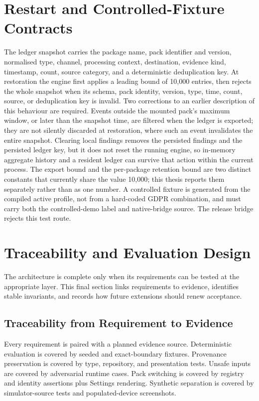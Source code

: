 \section{Restart and Controlled-Fixture Contracts}

The ledger snapshot carries the package name, pack identifier and version, normalised type, channel, processing context, destination, evidence kind, timestamp, count, source category, and a deterministic deduplication key. At restoration the engine first applies a leading bound of 10{,}000 entries, then rejects the whole snapshot when its schema, pack identity, version, type, time, count, source, or deduplication key is invalid. Two corrections to an earlier description of this behaviour are required. Events outside the mounted pack's maximum window, or later than the snapshot time, are filtered when the ledger is exported; they are not silently discarded at restoration, where such an event invalidates the entire snapshot. Clearing local findings removes the persisted findings and the persisted ledger key, but it does not reset the running engine, so in-memory aggregate history and a resident ledger can survive that action within the current process. The export bound and the per-package retention bound are two distinct constants that currently share the value 10{,}000; this thesis reports them separately rather than as one number. A controlled fixture is generated from the compiled active profile, not from a hard-coded GDPR combination, and must carry both the controlled-demo label and native-bridge source. The release bridge rejects this test route.



\section{Traceability and Evaluation Design}

The architecture is complete only when its requirements can be tested at the appropriate layer. This final section links requirements to evidence, identifies stable invariants, and records how future extensions should renew acceptance.

\subsection{Traceability from Requirement to Evidence}

Every requirement is paired with a planned evidence source. Deterministic evaluation is covered by seeded and exact-boundary fixtures. Provenance preservation is covered by type, repository, and presentation tests. Unsafe inputs are covered by adversarial runtime cases. Pack switching is covered by registry and identity assertions plus Settings rendering. Synthetic separation is covered by simulator-source tests and populated-device screenshots.


